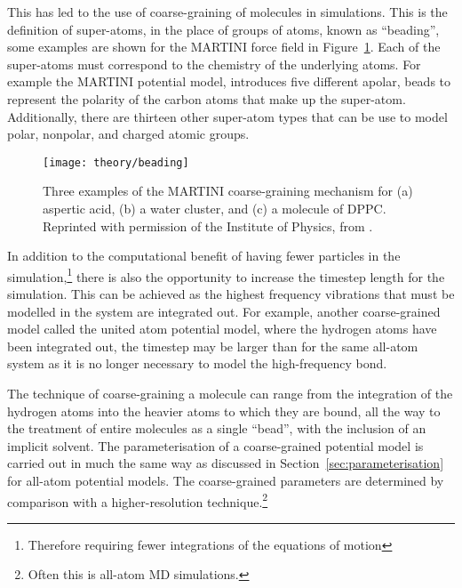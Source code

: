 This has led to the use of coarse-graining of molecules in simulations.
This is the definition of super-atoms, in the place of groups of atoms, known as ``beading'', some examples are shown for the MARTINI force field\autocite{marrink_martini_2007} in Figure~\ref{fig:cg}.
Each of the super-atoms must correspond to the chemistry of the underlying atoms.
For example the MARTINI potential model, introduces five different apolar, beads to represent the polarity of the carbon atoms that make up the super-atom.
Additionally, there are thirteen other super-atom types that can be use to model polar, nonpolar, and charged atomic groups.
%
\begin{figure}
    \centering
    \texttt{[image: theory/beading]}
    \caption{Three examples of the MARTINI coarse-graining mechanism for (a) aspertic acid, (b) a water cluster, and (c) a molecule of DPPC. Reprinted with permission of the Institute of Physics, from \cite{pluhackova_biomembranes_2015}.}
    \label{fig:cg}
\end{figure}
%

In addition to the computational benefit of having fewer particles in the simulation,\footnote{Therefore requiring fewer integrations of the equations of motion} there is also the opportunity to increase the timestep length for the simulation.\autocite{pluhackova_biomembranes_2015}
This can be achieved as the highest frequency vibrations that must be modelled in the system are integrated out.
For example, another coarse-grained model called the united atom potential model, where the hydrogen atoms have been integrated out, the timestep may be larger than for the same all-atom system as it is no longer necessary to model the high-frequency  bond.

The technique of coarse-graining a molecule can range from the integration of the hydrogen atoms into the heavier atoms to which they are bound, all the way to the treatment of entire molecules as a single ``bead'', with the inclusion of an implicit solvent.
The parameterisation of a coarse-grained potential model is carried out in much the same way as discussed in Section~\ref{sec:parameterisation} for all-atom potential models.
The coarse-grained parameters are determined by comparison with a higher-resolution technique.\footnote{Often this is all-atom MD simulations.}